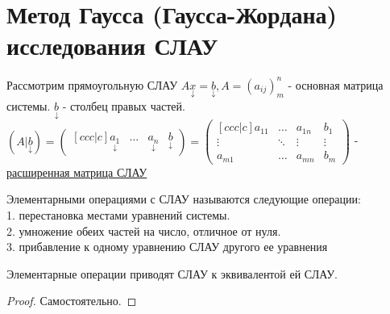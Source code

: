 \documentclass[../main.tex]{subfiles}
\begin{document}
\section{Метод Гаусса (Гаусса-Жордана) исследования СЛАУ}
Рассмотрим  прямоугольную СЛАУ $A \underset{\downarrow}{x}=\underset{\downarrow}{b}, A = (a_{ij})_{m}^{n}$ - основная матрица системы. $\underset{\downarrow}{b}$ - столбец правых частей. $(A|\underset{\downarrow}{b})=\begin{pmatrix}[ccc|c]
    \underset{\downarrow}{a_{1}}& \dots & \underset{\downarrow}{a_{n}}& \underset{\downarrow}{b}
\end{pmatrix}=\begin{pmatrix}[ccc|c]
    a_{11}&\dots & a_{1n} & b_{1}\\ 
    \vdots & \ddots & \vdots & \vdots \\ 
    a_{m1} & \dots & a_{mn} & b_{m}
\end{pmatrix}$ - \underline{расширенная матрица СЛАУ}
\begin{definition}
    Элементарными операциями с СЛАУ называются следующие операции:
    \\ 1. перестановка местами уравнений системы. 
    \\2. умножение обеих частей на число, отличное от нуля. 
    \\3. прибавление к одному уравнению СЛАУ другого ее уравнения
\end{definition}


\begin{theorem}
    Элементарные операции приводят СЛАУ к эквивалентой ей СЛАУ.
\end{theorem}
\begin{proof}
    Самостоятельно.
\end{proof}
\end{document}
